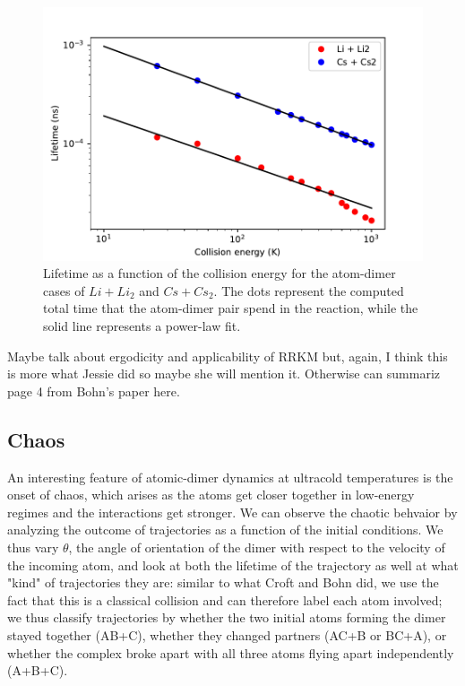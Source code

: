 \documentclass[%
 reprint,
 amsmath,amssymb,
 aps,
10pt
]{revtex4-1}
\begin{document}
\begin{figure}[ht]
\begin{center}
\includegraphics[width=1.1\linewidth]{lifetime.pdf}
\caption{Lifetime as a function of the collision energy for the atom-dimer cases of $Li + Li_2$ and $Cs + Cs_2$. The dots represent the computed total time that the atom-dimer pair spend in the reaction, while the solid line represents a power-law fit.}
\label{fig:lifetime}
\end{center}
\end{figure}

{\color{red}Maybe talk about ergodicity and applicability of RRKM but, again, I think this is more what Jessie did so maybe she will mention it. Otherwise can summariz page 4 from Bohn's paper here.}

\subsection{\label{sec:level3}Chaos}

An interesting feature of atomic-dimer dynamics at ultracold temperatures is the onset of chaos, which arises as the atoms get closer together in low-energy regimes and the interactions get stronger. We can observe the chaotic behvaior by analyzing the outcome of trajectories as a function of the initial conditions. We thus vary $\theta$, the angle of orientation of the dimer with respect to the velocity of the incoming atom, and look at both the lifetime of the trajectory as well at what "kind" of trajectories they are: similar to what Croft and Bohn did, we use the fact that this is a classical collision and can therefore label each atom involved; we thus classify trajectories by whether the two initial atoms forming the dimer stayed together (AB+C), whether they changed partners (AC+B or BC+A), or whether the complex broke apart with all three atoms flying apart independently (A+B+C).
\end{document}
